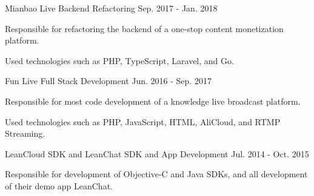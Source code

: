 \begin{cventries}
  \cventry
    {Mianbao Live} %
    {Backend Refactoring} %
    {} %
    {Sep. 2017 - Jan. 2018} %
    {
      \begin{cvitems} %
        \item {Responsible for refactoring the backend of a one-stop content monetization platform.}
        \item {Used technologies such as PHP, TypeScript, Laravel, and Go.}
      \end{cvitems}
    }

  \cventry
    {Fun Live} %
    {Full Stack Development} %
    {} %
    {Jun. 2016 - Sep. 2017} %
    {
      \begin{cvitems} %
        \item {Responsible for most code development of a knowledge live broadcast platform.}
        \item {Used technologies such as PHP, JavaScript, HTML, AliCloud, and RTMP Streaming.}
      \end{cvitems}
    }

  \cventry
    {LeanCloud SDK and LeanChat} %
    {SDK and App Development} %
    {} %
    {Jul. 2014 - Oct. 2015} %
    {
      \begin{cvitems} %
        \item {Responsible for development of Objective-C and Java SDKs, and all development of their demo app LeanChat.}
      \end{cvitems}
    }

\end{cventries}
